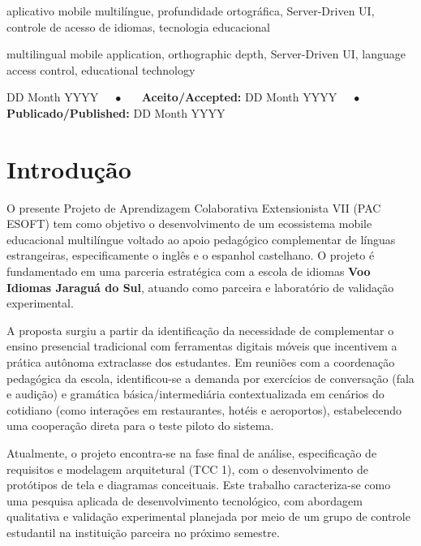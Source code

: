 \documentclass[portuguese]{sbcreviews-2025}%
\begin{document}
\begin{frontmatter}
\begin{pchaves}
aplicativo mobile multilíngue, profundidade ortográfica, Server-Driven UI, controle de acesso de idiomas, tecnologia educacional
\end{pchaves}

\begin{keywords}
multilingual mobile application, orthographic depth, Server-Driven UI, language access control, educational technology
\end{keywords}

\begin{dates}
 DD Month YYYY~~~$\bullet$~~~
{\sffamily\textbf{Aceito/Accepted:}} DD Month YYYY~~~$\bullet$~~~
{\sffamily\textbf{Publicado/Published:}} DD Month YYYY
\end{dates}

\end{frontmatter}

\section{Introdução}
\label{sec:intro}

O presente Projeto de Aprendizagem Colaborativa Extensionista VII (PAC ESOFT) tem como objetivo o desenvolvimento de um ecossistema mobile educacional multilíngue voltado ao apoio pedagógico complementar de línguas estrangeiras, especificamente o inglês e o espanhol castelhano. O projeto é fundamentado em uma parceria estratégica com a escola de idiomas \textbf{Voo Idiomas Jaraguá do Sul}, atuando como parceira e laboratório de validação experimental.

A proposta surgiu a partir da identificação da necessidade de complementar o ensino presencial tradicional com ferramentas digitais móveis que incentivem a prática autônoma extraclasse dos estudantes. Em reuniões com a coordenação pedagógica da escola, identificou-se a demanda por exercícios de conversação (fala e audição) e gramática básica/intermediária contextualizada em cenários do cotidiano (como interações em restaurantes, hotéis e aeroportos), estabelecendo uma cooperação direta para o teste piloto do sistema.

Atualmente, o projeto encontra-se na fase final de análise, especificação de requisitos e modelagem arquitetural (TCC 1), com o desenvolvimento de protótipos de tela e diagramas conceituais. Este trabalho caracteriza-se como uma pesquisa aplicada de desenvolvimento tecnológico, com abordagem qualitativa e validação experimental planejada por meio de um grupo de controle estudantil na instituição parceira no próximo semestre.
\end{document}
